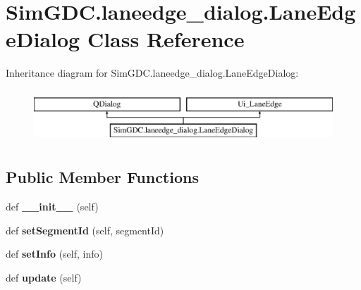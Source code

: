 \hypertarget{class_sim_g_d_c_1_1laneedge__dialog_1_1_lane_edge_dialog}{}\section{Sim\+G\+D\+C.\+laneedge\+\_\+dialog.\+Lane\+Edge\+Dialog Class Reference}
\label{class_sim_g_d_c_1_1laneedge__dialog_1_1_lane_edge_dialog}
Inheritance diagram for Sim\+G\+D\+C.\+laneedge\+\_\+dialog.\+Lane\+Edge\+Dialog\+:\begin{figure}[H]
\begin{center}
\leavevmode
\includegraphics[height=2.000000cm]{class_sim_g_d_c_1_1laneedge__dialog_1_1_lane_edge_dialog}
\end{center}
\end{figure}
\subsection*{Public Member Functions}
\begin{DoxyCompactItemize}
\item 
\hypertarget{class_sim_g_d_c_1_1laneedge__dialog_1_1_lane_edge_dialog_a8775606b9df2579d07d1a611c8284124}{}def {\bfseries \+\_\+\+\_\+init\+\_\+\+\_\+} (self)\label{class_sim_g_d_c_1_1laneedge__dialog_1_1_lane_edge_dialog_a8775606b9df2579d07d1a611c8284124}

\item 
\hypertarget{class_sim_g_d_c_1_1laneedge__dialog_1_1_lane_edge_dialog_ae6a1a5b36a2aa2aff346029806b97070}{}def {\bfseries set\+Segment\+Id} (self, segment\+Id)\label{class_sim_g_d_c_1_1laneedge__dialog_1_1_lane_edge_dialog_ae6a1a5b36a2aa2aff346029806b97070}

\item 
\hypertarget{class_sim_g_d_c_1_1laneedge__dialog_1_1_lane_edge_dialog_a8b790c749a613ec62f44640e7be41508}{}def {\bfseries set\+Info} (self, info)\label{class_sim_g_d_c_1_1laneedge__dialog_1_1_lane_edge_dialog_a8b790c749a613ec62f44640e7be41508}

\item 
\hypertarget{class_sim_g_d_c_1_1laneedge__dialog_1_1_lane_edge_dialog_adc18f9b100e707b73ad11ae57af9a069}{}def {\bfseries update} (self)\label{class_sim_g_d_c_1_1laneedge__dialog_1_1_lane_edge_dialog_adc18f9b100e707b73ad11ae57af9a069}

\end{DoxyCompactItemize}
